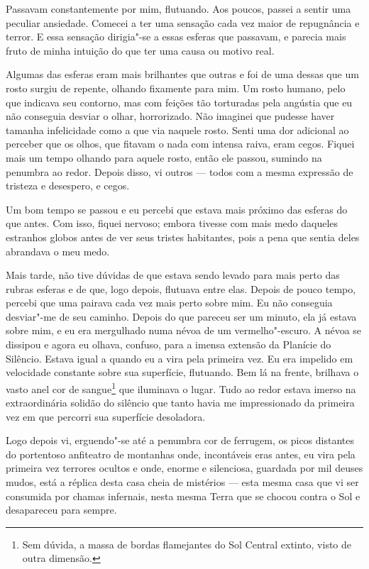Passavam constantemente por mim, flutuando. Aos poucos, passei a sentir uma peculiar ansiedade. Comecei a ter uma
sensação cada vez maior de repugnância e terror. E essa sensação dirigia"-se a essas esferas que passavam, e parecia
mais fruto de minha intuição do que ter uma causa ou motivo real.

Algumas das esferas eram mais brilhantes que outras e foi de uma dessas que um rosto surgiu de repente, olhando
fixamente para mim. Um rosto humano, pelo que indicava seu contorno, mas com feições tão torturadas pela angústia que
eu não conseguia desviar o olhar, horrorizado. Não imaginei que pudesse haver tamanha infelicidade como a que via
naquele rosto. Senti uma dor adicional ao perceber que os olhos, que fitavam o nada com intensa raiva, eram cegos.
Fiquei mais um tempo olhando para aquele rosto, então ele passou, sumindo na penumbra ao redor. Depois disso, vi
outros --- todos com a mesma expressão de tristeza e desespero, e cegos. 

Um bom tempo se passou e eu percebi que estava mais próximo das esferas do que antes. Com isso, fiquei nervoso; embora
tivesse com mais medo daqueles estranhos globos antes de ver seus tristes habitantes, pois a pena que sentia deles
abrandava o meu medo.

Mais tarde, não tive dúvidas de que estava sendo levado para mais perto das rubras esferas e de que, logo depois,
flutuava entre elas. Depois de pouco tempo, percebi que uma pairava cada vez mais perto sobre mim. Eu não conseguia
desviar"-me de seu caminho. Depois do que pareceu ser um minuto, ela já estava sobre mim, e eu era mergulhado numa névoa
de um vermelho"-escuro. A névoa se dissipou e agora eu olhava, confuso, para a imensa extensão da Planície do Silêncio.
Estava igual a quando eu a vira pela primeira vez. Eu era impelido em velocidade constante sobre sua superfície,
flutuando. Bem lá na frente, brilhava o vasto anel cor de sangue\footnote{ Sem dúvida, a massa de bordas
flamejantes do Sol Central extinto, visto de outra dimensão.} que iluminava o lugar. Tudo ao redor estava imerso
na extraordinária solidão do silêncio que tanto havia me impressionado da primeira vez em que percorri sua superfície
desoladora.

Logo depois vi, erguendo"-se até a penumbra cor de ferrugem, os picos distantes do portentoso anfiteatro de montanhas
onde, incontáveis eras antes, eu vira pela primeira vez terrores ocultos e onde, enorme e silenciosa, guardada por mil
deuses mudos, está a réplica desta casa cheia de mistérios --- esta mesma casa que vi ser consumida por chamas infernais,
nesta mesma Terra que se chocou contra o Sol e desapareceu para sempre. 

